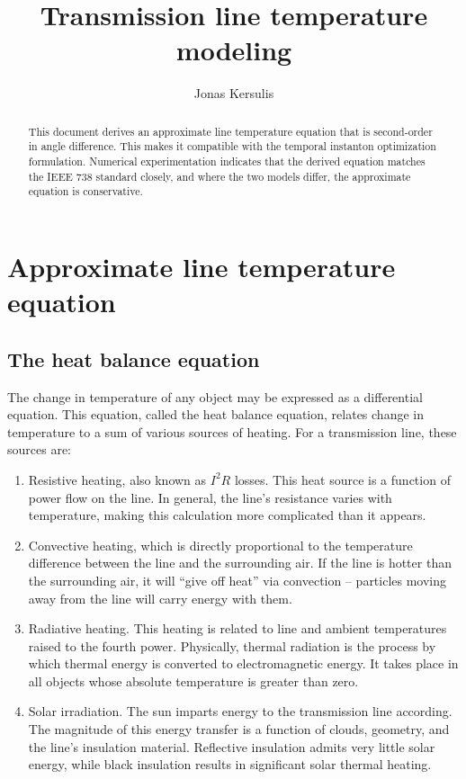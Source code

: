 \documentclass{article}
\author{Jonas Kersulis}
\title{Transmission line temperature modeling}
\date{ }
\begin{document}
    
    \maketitle
    
\begin{abstract}
This document derives an approximate line temperature equation that is second-order in angle difference. This makes it compatible with the temporal instanton optimization formulation. Numerical experimentation indicates that the derived equation matches the IEEE 738 standard closely, and where the two models differ, the approximate equation is conservative.
\end{abstract}
    
\section{Approximate line temperature equation}\label{transmission-line-heating}

\subsection{The heat balance equation}
    The change in temperature of any object may be expressed as a
differential equation. This equation, called the heat balance equation,
relates change in temperature to a sum of various sources of heating.
For a transmission line, these sources are:

\begin{enumerate}
\item
  Resistive heating, also known as $I^2R$ losses. This heat source is a
  function of power flow on the line. In general, the line's resistance
  varies with temperature, making this calculation more complicated than
  it appears.
\item
  Convective heating, which is directly proportional to the temperature
  difference between the line and the surrounding air. If the line is
  hotter than the surrounding air, it will ``give off heat'' via
  convection -- particles moving away from the line will carry energy
  with them.
\item
  Radiative heating. This heating is related to line and ambient
  temperatures raised to the fourth power. Physically, thermal radiation
  is the process by which thermal energy is converted to electromagnetic
  energy. It takes place in all objects whose absolute temperature is
  greater than zero.
\item
  Solar irradiation. The sun imparts energy to the transmission line
  according. The magnitude of this energy transfer is a function of
  clouds, geometry, and the line's insulation material. Reflective
  insulation admits very little solar energy, while black insulation
  results in significant solar thermal heating.
\end{enumerate}
\end{document}
